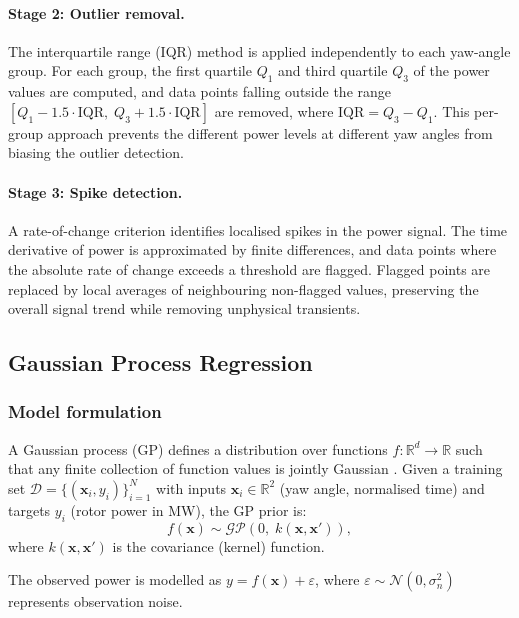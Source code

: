 \documentclass[12pt]{article}
\newcommand{\R}{\mathbb{R}}
\newcommand{\vect}[1]{\mathbf{#1}}
\begin{document}
\paragraph{Stage 2: Outlier removal.}
The interquartile range (IQR) method is applied independently to each yaw-angle group.
For each group, the first quartile $Q_1$ and third quartile $Q_3$ of the power values are computed, and data points falling outside the range $[Q_1 - 1.5 \cdot \text{IQR},\; Q_3 + 1.5 \cdot \text{IQR}]$ are removed, where $\text{IQR} = Q_3 - Q_1$.
This per-group approach prevents the different power levels at different yaw angles from biasing the outlier detection.

\paragraph{Stage 3: Spike detection.}
A rate-of-change criterion identifies localised spikes in the power signal.
The time derivative of power is approximated by finite differences, and data points where the absolute rate of change exceeds a threshold are flagged.
Flagged points are replaced by local averages of neighbouring non-flagged values, preserving the overall signal trend while removing unphysical transients.

\subsection{Gaussian Process Regression}
\label{sec:gpr}

\subsubsection{Model formulation}

A Gaussian process (GP) defines a distribution over functions $f: \R^d \to \R$ such that any finite collection of function values is jointly Gaussian \citep{Rasmussen2006}.
Given a training set $\mathcal{D} = \{(\vect{x}_i, y_i)\}_{i=1}^{N}$ with inputs $\vect{x}_i \in \R^2$ (yaw angle, normalised time) and targets $y_i$ (rotor power in MW), the GP prior is:
\begin{equation}
    f(\vect{x}) \sim \mathcal{GP}\!\left(0,\; k(\vect{x}, \vect{x}')\right),
\end{equation}
where $k(\vect{x}, \vect{x}')$ is the covariance (kernel) function.

The observed power is modelled as $y = f(\vect{x}) + \varepsilon$, where $\varepsilon \sim \mathcal{N}(0, \sigma_n^2)$ represents observation noise.
\end{document}
